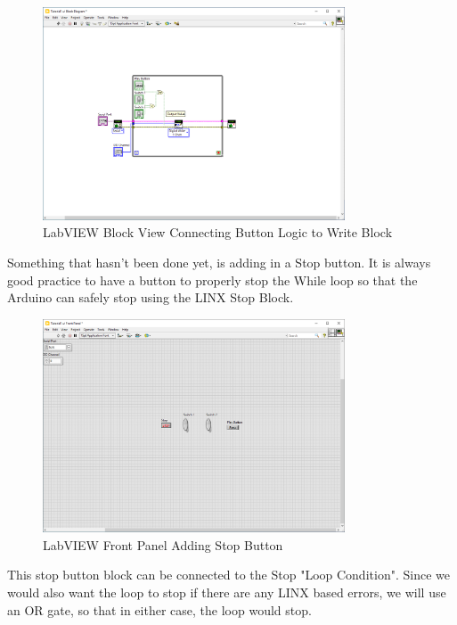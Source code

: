 \documentclass[a4paper,11pt]{report}
\begin{document}
\begin{figure}[H]
\centering
\includegraphics[width=0.8\textwidth]{screenshots/labview26}
\caption{LabVIEW Block View Connecting Button Logic to Write Block}
\end{figure}

Something that hasn't been done yet, is adding in a Stop button. It is always good practice to have a button to properly stop the While loop so that the Arduino can safely stop using the LINX Stop Block.

\begin{figure}[H]
\centering
\includegraphics[width=0.8\textwidth]{screenshots/labview27}
\caption{LabVIEW Front Panel Adding Stop Button}
\end{figure}

This stop button block can be connected to the Stop "Loop Condition". Since we would also want the loop to stop if there are any LINX based errors, we will use an OR gate, so that in either case, the loop would stop.
\end{document}
